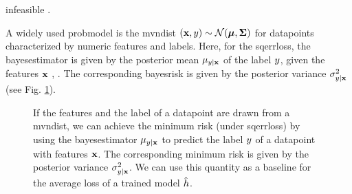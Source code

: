 {{\begin{enumerate}[label=\arabic*)]
		infeasible \cite{cooper1990computational}. 
   	\end{enumerate}
	A widely used \gls{probmodel} is the \gls{mvndist} $\left( {\bf x},y \right) \sim \mathcal{N}({\bm \mu},{\bm \Sigma})$ 
	for \gls{datapoint}s characterized by numeric \gls{feature}s and \gls{label}s.
	Here, for the \gls{sqerrloss}, the \gls{bayesestimator} is given by the posterior 
	\gls{mean} $\mu_{y|{\bf x}}$ of the \gls{label} $y$, given the 
	\gls{feature}s ${\bf x}$ \cite{LC}, \cite{GrayProbBook}. The corresponding \gls{bayesrisk} 
	is given by the posterior \gls{variance} 
	$\sigma^{2}_{y|{\bf x}}$ (see Fig. \ref{fig_post_baseline_dict}).
	\begin{figure}[H]
		\begin{center}
		\end{center}
		\caption{If the \gls{feature}s and the \gls{label} of a \gls{datapoint} are drawn from a \gls{mvndist}, we 
		can achieve the \gls{minimum} \gls{risk} (under \gls{sqerrloss}) by using the \gls{bayesestimator} $\mu_{y|{\bf x}}$ 
		to predict the \gls{label} $y$ of a \gls{datapoint} with \gls{feature}s ${\bf x}$. The corresponding 
		\gls{minimum} \gls{risk} is given by the posterior \gls{variance} $\sigma^{2}_{y|{\bf x}}$. We can use 
		this quantity as a baseline for the average \gls{loss} of a trained \gls{model} $\hat{h}$. \label{fig_post_baseline_dict}}

\end{figure}}}
